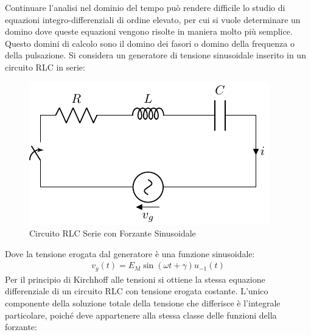 \documentclass{article}
\numberwithin{equation}{subsection}
\begin{document}
Continuare l'analisi nel dominio del tempo può rendere difficile lo studio di equazioni integro-differenziali di ordine elevato, per cui si vuole determinare un domino dove 
queste equazioni vengono risolte in maniera molto più semplice. Questo domini di calcolo sono il domino dei fasori o domino della frequenza o della pulsazione. Si considera 
un generatore di tensione sinusoidale inserito in un circuito RLC in serie:
\begin{figure}[ht]%
    \centering
    \includegraphics{circuito-rlc-serie-sinsusoide.pdf}
    \caption{Circuito RLC Serie con Forzante Sinusoidale}
    \label{fig:circuito-rlc-serie-sinusoide}
\end{figure}
Dove la tensione erogata dal generatore è una funzione sinusoidale:
\begin{gather*}
    v_g(t)=E_M\sin(\omega t+\gamma)u_{-1}(t)
\end{gather*}
Per il principio di Kirchhoff alle tensioni si ottiene la stessa equazione differenziale di un circuito RLC con tensione erogata costante. L'unico componente della soluzione 
totale della tensione che differisce è l'integrale particolare, poiché deve appartenere alla stessa classe delle funzioni della forzante:
\end{document}
